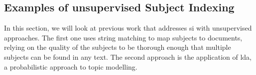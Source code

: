 \subsection{Examples of unsupervised Subject Indexing} \label{subject_indexing_examples}

In this section, we will look at previous work that addresses \acrshort{si} with unsupervised approaches. The first one uses string matching to map subjects to documents, relying on the quality of the subjects to be thorough enough that multiple subjects can be found in any text. The second approach is the application of \acrlong{lda}, a probabilistic approach to topic modelling.



